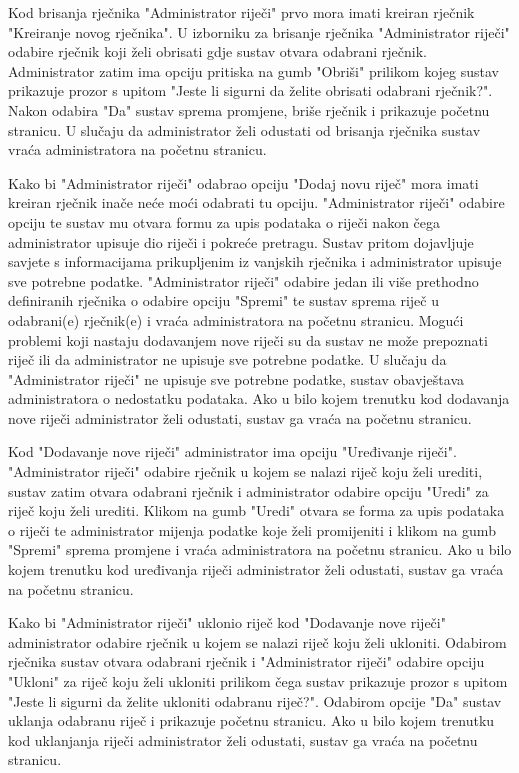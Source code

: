 Kod brisanja rječnika "Administrator riječi" prvo mora imati kreiran rječnik "Kreiranje novog rječnika". U izborniku za brisanje rječnika "Administrator riječi" odabire rječnik koji želi obrisati gdje sustav otvara odabrani rječnik. Administrator zatim ima opciju pritiska na gumb "Obriši" prilikom kojeg sustav prikazuje prozor s upitom "Jeste li sigurni da želite obrisati odabrani rječnik?". Nakon odabira "Da" sustav sprema promjene, briše rječnik i prikazuje početnu stranicu. U slučaju da administrator želi odustati od brisanja rječnika sustav vraća administratora na početnu stranicu. 

Kako bi "Administrator riječi" odabrao opciju "Dodaj novu riječ" mora imati kreiran rječnik inače neće moći odabrati tu opciju. "Administrator riječi" odabire opciju te sustav mu otvara formu za upis podataka o riječi nakon čega administrator upisuje dio riječi i pokreće pretragu. Sustav pritom dojavljuje savjete s informacijama prikupljenim iz vanjskih rječnika i administrator upisuje sve potrebne podatke. "Administrator riječi" odabire jedan ili više prethodno definiranih rječnika o odabire opciju "Spremi" te sustav sprema riječ u odabrani(e) rječnik(e) i vraća administratora na početnu stranicu. Mogući problemi koji nastaju dodavanjem nove riječi su da sustav ne može prepoznati riječ ili da administrator ne upisuje sve potrebne podatke. U slučaju  da "Administrator riječi" ne upisuje sve potrebne podatke, sustav obavještava administratora o nedostatku podataka.
Ako u bilo kojem trenutku kod dodavanja nove riječi administrator želi odustati, sustav ga vraća na početnu stranicu.

Kod "Dodavanje nove riječi" administrator ima opciju "Uređivanje riječi". "Administrator riječi" odabire rječnik u kojem se nalazi riječ koju želi urediti, sustav zatim otvara odabrani rječnik i administrator odabire opciju "Uredi" za riječ koju želi urediti. Klikom na gumb "Uredi" otvara se forma za upis podataka o riječi te administrator mijenja podatke koje želi promijeniti i klikom na gumb "Spremi" sprema promjene i vraća administratora na početnu stranicu. Ako u bilo kojem trenutku kod uređivanja riječi administrator želi odustati, sustav ga vraća na početnu stranicu.

Kako bi "Administrator riječi" uklonio riječ kod "Dodavanje nove riječi" administrator odabire rječnik u kojem se nalazi riječ koju želi ukloniti. Odabirom rječnika sustav otvara odabrani rječnik
i "Administrator riječi" odabire opciju "Ukloni" za riječ koju želi ukloniti prilikom čega sustav prikazuje prozor s upitom "Jeste li sigurni da želite ukloniti odabranu riječ?". Odabirom opcije "Da" sustav uklanja odabranu riječ i prikazuje početnu stranicu. Ako u bilo kojem trenutku kod uklanjanja riječi administrator želi odustati, sustav ga vraća na početnu stranicu.


